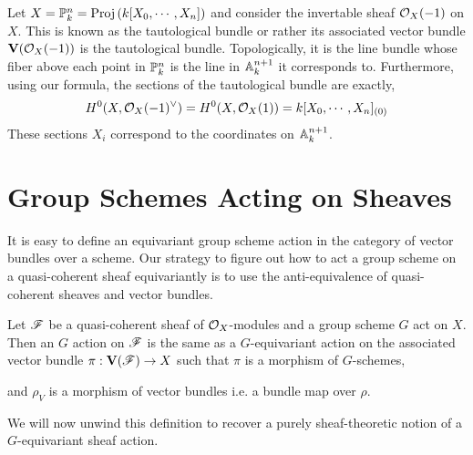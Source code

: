 \documentclass[12pt]{article}
\begin{document}
\begin{example}
Let $X = \P^n_k = \Proj{k[X_0, \cdots, X_n]}$ and consider the invertable sheaf $\struct{X}(-1)$ on $X$. This is known as the tautological bundle or rather its associated vector bundle $\V(\struct{X}(-1))$ is the tautological bundle. Topologically, it is the line bundle whose fiber above each point in $\P^n_k$ is the line in $\A^{n+1}_k$ it corresponds to. Furthermore, using our formula, the sections of the tautological bundle are exactly,
\[ H^0(X, \struct{X}(-1)^\vee) = H^0(X, \struct{X}(1)) = k[X_0, \cdots, X_n]_{(0)} \]
These sections $X_i$ correspond to the coordinates on $\A_k^{n+1}$.
\end{example}


\section{Group Schemes Acting on Sheaves}

\begin{remark}
It is easy to define an equivariant group scheme action in the category of vector bundles over a scheme. Our strategy to figure out how to act a group scheme on a quasi-coherent sheaf equivariantly is to use the anti-equivalence of quasi-coherent sheaves and vector bundles.
\end{remark}

\begin{definition}
Let $\F$ be a quasi-coherent sheaf of $\struct{X}$-modules and a group scheme $G$ act on $X$. Then an $G$ action on $\F$ is the same as a $G$-equivariant action on the associated vector bundle $\pi : \mathbf{V}(\F) \to X$
such that $\pi$ is a morphism of $G$-schemes,
\begin{center}
\end{center}
and $\rho_V$ is a morphism of vector bundles i.e. a bundle map over $\rho$.
\end{definition}

\begin{remark}
We will now unwind this definition to recover a purely sheaf-theoretic notion of a $G$-equivariant sheaf action.
\end{remark}
\end{document}
